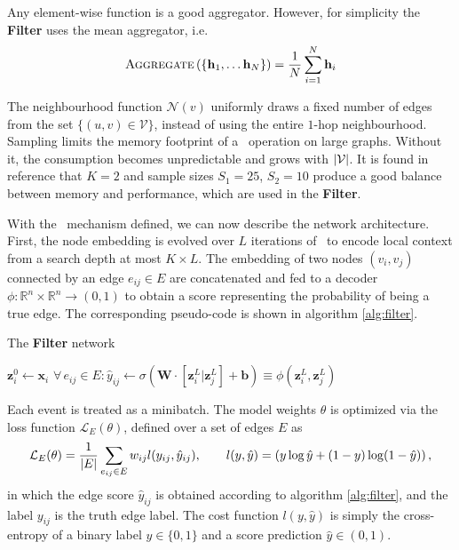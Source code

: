 Any element-wise function is a good aggregator. 
However, for simplicity the \textbf{Filter} uses the mean aggregator, i.e.
\begin{equation}
    \label{eq:10.1}
    \textsc{Aggregate}\left( \{ \mathbf{h}_1 ,\dotsc  \mathbf{h}_N \}\right) = \frac{1}{N} \sum_{i=1} ^N \mathbf{h}_i
\end{equation}

The neighbourhood function $\mathcal{N}(v)$ uniformly draws a fixed number of edges from the set $\{(u,v)\in \mathcal{V} \}$, instead of using the entire $1$-hop neighbourhood.
Sampling limits the memory footprint of a \graphsage~operation on large graphs. 
Without it, the consumption becomes unpredictable and grows with $\abs{\mathcal{V}}$.
It is found in reference \cite{graphsage} that $K=2$ and sample sizes $S_1=25$, $S_2=10$ produce a good balance between memory and performance, which are used in the \textbf{Filter}.

With the \graphsage~mechanism defined, we can now describe the network architecture. 
First, the node embedding is evolved over $L$ iterations of \graphsage~to encode local context from a search depth at most $K\times L$. 
The embedding of two nodes $(v_i, v_j)$ connected by an edge $e_{ij} \in {E}$ are concatenated and fed to a decoder $\phi: \mathbb{R}^n\times \mathbb{R}^n\rightarrow (0,1)$ to obtain a score representing the probability of being a true edge.
The corresponding pseudo-code is shown in algorithm \ref{alg:filter}.

\begin{algorithm}
\caption{The \textbf{Filter} network }\label{alg:filter}
$\mathbf{z}^0_{i} \gets \mathbf{x}_i$\;
$\forall \,  e_{ij} \in E: \hat{y}_{ij} \gets \sigma(\mathbf{W}\cdot [\mathbf{z}_i^L | \mathbf{z}_j^L] + \mathbf{b}) \equiv \phi(\mathbf{z}_i^L, \mathbf{z}_j^L)$ 
\end{algorithm}

Each event is treated as a minibatch. The model weights $\theta$ is optimized via the loss function $\mathcal{L}_{E} (\theta)$, defined over a set of edges $E$ as
\begin{equation}
    \label{eq:10.2}
    \mathcal{L}_{E}(\theta) =  \frac{1}{\abs{E}} \sum_{e_{ij}\in E} w_{ij}l(y_{ij}, \hat{y}_{ij}), \quad \quad l(y, \hat{y}) = \left( y\log \hat{y} + (1-y) \log(1-\hat{y} ) \right),
\end{equation}
in which the edge score $\hat{y}_{ij}$ is obtained according to algorithm \ref{alg:filter}, and the label $y_{ij}$ is the truth edge label.
The cost function $l(y,\hat{y})$ is simply the cross-entropy of a binary label $y\in\{0,1\}$ and a score prediction $\hat{y}\in(0,1)$. 

